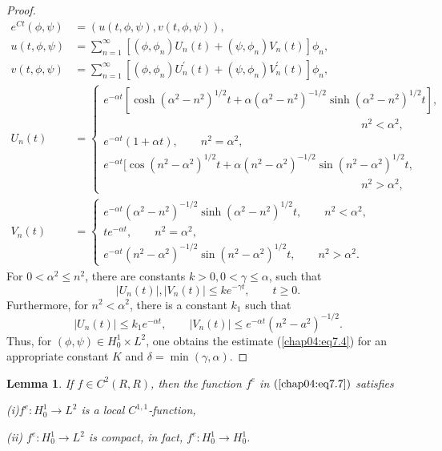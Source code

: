 \documentclass{surv-l}
\theoremstyle{plain}
\newtheorem{lemma}[theorem]{Lemma}
\theoremstyle{definition}
\numberwithin{equation}{section}
\numberwithin{figure}{chapter}
\begin{document}
\begin{proof}
\begin{align*}
e^{Ct}(\phi, \psi)&=(u(t, \phi, \psi), v(t, \phi, \psi)),\\
u(t,\phi, \psi)&=\sum_{n=1}^{\infty}[(\phi, \phi_{n})U_{n}(t)+(\psi, \phi_{n})V_{n}(t)]\phi_{n},\\
v(t, \phi, \psi)&=\sum_{n=1}^{\infty}[(\phi, \phi_{n})U_{n}^{\prime}(t)+(\psi, \phi_{n})V^{\prime}_{n}(t)]\phi_{n},\\
U_{n}(t)&=\left\{\begin{array}{l}
e^{-\alpha t}[\cosh(\alpha^{2}-n^{2})^{1/2}t+\alpha(\alpha^{2}-n^{2})^{-1/2}\sinh(\alpha^{2}-n^{2})^{1/2}t],\\
\qquad\qquad\qquad\qquad\qquad\qquad\qquad\qquad\qquad\qquad\qquad\quad n^{2}<\alpha^{2},\\
e^{-\alpha t}(1+\alpha t),\qquad n^{2}=\alpha^{2},\\
e^{-\alpha t}[\cos(n^{2}-\alpha^{2})^{1/2}t+\alpha(n^{2}-\alpha^{2})^{-1/2}\sin(n^{2}-\alpha^{2})^{1/2}t,\\
\qquad\qquad\qquad\qquad\qquad\qquad\qquad\qquad\qquad\qquad\qquad\quad n^{2}>\alpha^{2},
\end{array}\right.\\
V_{n}(t)&=\left\{\begin{array}{l}
e^{-\alpha t}(\alpha^{2}-n^{2})^{-1/2}\sinh(\alpha^{2}-n^{2})^{1/2}t, \qquad n^{2}<\alpha^{2},\\
te^{-\alpha t},\qquad n^{2}=\alpha^{2},\\
e^{-\alpha t}(n^{2}-\alpha^{2})^{-1/2}\sin(n^{2}-\alpha^{2})^{1/2}t, \qquad n^{2}>\alpha^{2}.
\end{array}\right.
\end{align*}
For $0<\alpha^{2}\leq n^{2}$, there are constants $ k>0, 0<\gamma\leq\alpha$, such that
\begin{equation*}
|U_{n}(t)|, |V_{n}(t)|\leq ke^{-\gamma t},\qquad t\geq 0.
\end{equation*}
Furthermore, for $n^{2}<\alpha^{2}$, there is a constant $k_{1}$ such that
\begin{equation*}
|U_{n}(t)|\leq k_{1}e^{-\alpha t},\qquad |V_{n}(t)|\leq e^{-\alpha t}(n^{2}-a^{2})^{-1/2}.
\end{equation*}
Thus, for $(\phi, \psi)\in H_{0}^{1}\times L^{2}$, one obtains the estimate (\ref{chap04:eq7.4}) for an appropriate constant $K$ and $\delta=\min(\gamma, \alpha)$.
\end{proof}

\begin{lemma}\label{lem4.7.4} If $f\in C^{2}(R, R)$, then the function $f^{e}$ in $(\ref{chap04:eq7.7})$ satisfies

\emph{(i)}$f^{e}\!:H_{0}^{1}\rightarrow L^{2}$ is a local $C^{1,1}$-function,

\emph{(ii)} $f^{e}\!:H_{0}^{1}\rightarrow L^{2}$ is compact, in fact, $f^{e}\!:H_{0}^{1}\rightarrow H_{0}^{1}$.
\end{lemma}
\end{document}
